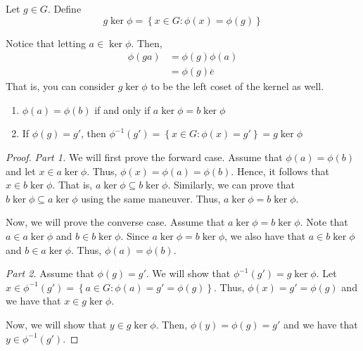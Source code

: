 \begin{definition}[]
    Let \(g \in G\). Define
    \[
        g\ker\phi = \left\{x \in G : \phi(x) = \phi(g)\right\}
    \]
\end{definition}

Notice that letting \(a \in \ker\phi\). Then,
\[
\begin{aligned}
    \phi(ga) &= \phi(g)\phi(a) \\
             &= \phi(g)\overline{e} 
\end{aligned}
\]
That is, you can consider \(g\ker\phi\) to be the left coset of the kernel as well.

\begin{theorem}
    \phantom{gg}

    \begin{enumerate}
        \item \(\phi(a) = \phi(b)\) if and only if \(a\ker\phi = b\ker\phi\)
        \item If \(\phi(g) = g'\), then \(\phi^{-1}(g') = \left\{x \in G : \phi(x) = g'\right\} = g\ker\phi\)
    \end{enumerate}
\end{theorem}

\begin{proof}
    \phantom{g fucking g}

    \textit{Part 1.} We will first prove the forward case. Assume that \(\phi(a) = \phi(b)\) and let \(x \in a\ker\phi\). Thus, \(\phi(x) = \phi(a) = \phi(b)\). Hence, it follows that \(x \in b\ker\phi\). That is, \(a\ker\phi \subseteq b\ker\phi\). Similarly, we can prove that \(b\ker\phi \subseteq a\ker\phi\) using the same maneuver. Thus, \(a\ker\phi = b\ker\phi\).

    Now, we will prove the converse case. Assume that \(a\ker\phi = b\ker\phi\). Note that \(a \in a\ker\phi\) and \(b \in b\ker\phi\). Since \(a\ker\phi = b\ker\phi\), we also have that \(a \in b\ker\phi\) and \(b \in a\ker\phi\). Thus, \(\phi(a) = \phi(b)\).

    \textit{Part 2.} Assume that \(\phi(g) = g'\). We will show that \(\phi^{-1}(g') = g\ker\phi\). Let \(x \in \phi^{-1}(g') = \left\{a \in G : \phi(a) = g' = \phi(g)\right\}\). Thus, \(\phi(x) = g' = \phi(g)\) and we have that \(x \in g\ker\phi\).

    Now, we will show that \(y \in g\ker\phi\). Then, \(\phi(y) = \phi(g) = g'\) and we have that \(y \in \phi^{-1}(g')\).
\end{proof}

